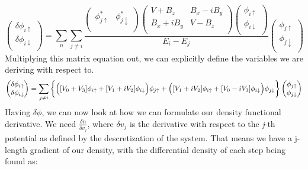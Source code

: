 \documentclass[10pt]{revtex4-1}
\newcommand{\ua}{\uparrow}
\newcommand{\da}{\downarrow}
\begin{document}
\begin{equation}
  \begin{pmatrix}
    \delta \phi_{i \ua} \\
    \delta \phi_{i \da} \\
  \end{pmatrix}
  = \sum_n \sum_{j \neq i} \frac{
  \begin{pmatrix}
    \phi_{j \ua}^* & \phi_{j \da}^* \\
  \end{pmatrix}
  \begin{pmatrix}
    V + B_z & B_x - iB_y \\
    B_x + iB_y & V - B_z \\
  \end{pmatrix}
  \begin{pmatrix}
    \phi_{i \ua} \\
    \phi_{i \da} \\
  \end{pmatrix}}
  {E_i - E_j}
  \begin{pmatrix}
    \phi_{j \ua} \\
    \phi_{j \da} \\
  \end{pmatrix}
\end{equation}
Multiplying this matrix equation out, we can explicitly define the variables we are deriving with respect to.
\begin{equation}
  \begin{pmatrix}
    \delta \phi_{i \ua} \\
    \delta \phi_{i \da} \\
  \end{pmatrix}
  = \sum_{j \neq i} \bigg{\{ } \Big{(}[V_0 + V_3]\phi_{i \ua} + [V_1 + i V_2]\phi_{i \da}\Big{)}\phi_{j \ua} + \Big{(}[V_1 + i V_2]\phi_{i \ua} + [V_0 - i V_3]\phi_{i \da}\Big{)}\phi_{j \da} \bigg{\} }
  \begin{pmatrix}
    \phi_{j \ua} \\
    \phi_{j \da} \\
  \end{pmatrix}
\end{equation}
Having $\delta \phi$, we can now look at how we can formulate our density functional derivative.
We need $\frac{\delta n}{\delta v_j}$, where $\delta v_j$ is the derivative with respect to the \textit{j}-th potential as defined by the descretization of the system.
That means we have a j-length gradient of our density, with the differential density of each step being found as:
\end{document}
